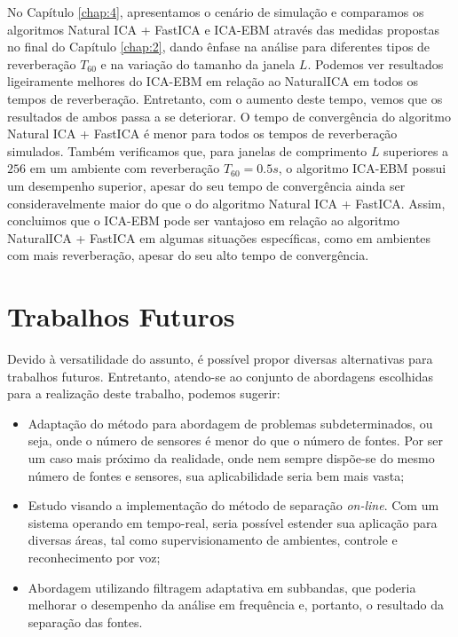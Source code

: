 No Capítulo \ref{chap:4}, apresentamos o cenário de simulação e comparamos os algoritmos Natural ICA + FastICA e ICA-EBM através das medidas propostas no final do Capítulo \ref{chap:2}, dando ênfase na análise para diferentes tipos de reverberação $T_{60}$ e na variação do tamanho da janela $L$. Podemos ver resultados ligeiramente melhores do ICA-EBM em relação ao NaturalICA em todos os tempos de reverberação. Entretanto, com o aumento deste tempo, vemos que os resultados de ambos passa a se deteriorar. O tempo de convergência do algoritmo Natural ICA + FastICA é menor para todos os tempos de reverberação simulados. Também verificamos que, para janelas de comprimento $L$ superiores a $256$ em um ambiente com reverberação $T_{60}=0.5s$, o algoritmo ICA-EBM possui um desempenho superior, apesar do seu tempo de convergência ainda ser consideravelmente maior do que o do algoritmo Natural ICA + FastICA. Assim, concluimos que o ICA-EBM pode ser vantajoso em relação ao algoritmo NaturalICA + FastICA em algumas situações específicas, como em ambientes com mais reverberação, apesar do seu alto tempo de convergência.

\section{Trabalhos Futuros}

Devido à versatilidade do assunto, é possível propor diversas alternativas para trabalhos futuros. Entretanto, atendo-se ao conjunto de abordagens escolhidas para a realização deste trabalho, podemos sugerir:
\begin{itemize}
    \item Adaptação do método para abordagem de problemas subdeterminados, ou seja, onde o número de sensores é menor do que o número de fontes. Por ser um caso mais próximo da realidade, onde nem sempre dispõe-se do mesmo número de fontes e sensores, sua aplicabilidade seria bem mais vasta;
    
    \item Estudo visando a implementação do método de separação \textit{on-line}. Com um sistema operando em tempo-real, seria possível estender sua aplicação para diversas áreas, tal como supervisionamento de ambientes, controle e reconhecimento por voz;
    
    \item Abordagem utilizando filtragem adaptativa em subbandas, que poderia melhorar o desempenho da análise em frequência e, portanto, o resultado da separação das fontes.
\end{itemize}